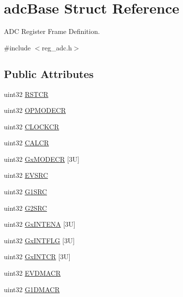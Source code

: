 \hypertarget{structadcBase}{}\section{adc\+Base Struct Reference}
\label{structadcBase}


A\+DC Register Frame Definition.  




{\ttfamily \#include $<$reg\+\_\+adc.\+h$>$}

\subsection*{Public Attributes}
\begin{DoxyCompactItemize}
\item 
uint32 \mbox{\hyperlink{structadcBase_a6662251d3a120476b32339f85c247c52}{R\+S\+T\+CR}}
\item 
uint32 \mbox{\hyperlink{structadcBase_a405e39a2253358f33354e2ce981a6074}{O\+P\+M\+O\+D\+E\+CR}}
\item 
uint32 \mbox{\hyperlink{structadcBase_a2f50ed8a77242fd86b460b2106d4d4f7}{C\+L\+O\+C\+K\+CR}}
\item 
uint32 \mbox{\hyperlink{structadcBase_a5a3b306cbec35ea66b0cfe5310d943a5}{C\+A\+L\+CR}}
\item 
uint32 \mbox{\hyperlink{structadcBase_a2e1b07b4a4782710b38211aa986c8199}{Gx\+M\+O\+D\+E\+CR}} \mbox{[}3\+U\mbox{]}
\item 
uint32 \mbox{\hyperlink{structadcBase_a3887189740f5fcbde31550a5c2097724}{E\+V\+S\+RC}}
\item 
uint32 \mbox{\hyperlink{structadcBase_a3865444918614fe8b7ffee5dd20a92af}{G1\+S\+RC}}
\item 
uint32 \mbox{\hyperlink{structadcBase_a25041ccf95b86b85f19bf4fc1567d3d4}{G2\+S\+RC}}
\item 
uint32 \mbox{\hyperlink{structadcBase_ad829b4c11b40bbc1f677552ee9b4d0a0}{Gx\+I\+N\+T\+E\+NA}} \mbox{[}3\+U\mbox{]}
\item 
uint32 \mbox{\hyperlink{structadcBase_a9e8165173cd3a6b357f03bd82da48c5e}{Gx\+I\+N\+T\+F\+LG}} \mbox{[}3\+U\mbox{]}
\item 
uint32 \mbox{\hyperlink{structadcBase_a2f6867ee8d242ebee0d811555ac8d485}{Gx\+I\+N\+T\+CR}} \mbox{[}3\+U\mbox{]}
\item 
uint32 \mbox{\hyperlink{structadcBase_abfb419ee9dc0e521ba0b632c93221234}{E\+V\+D\+M\+A\+CR}}
\item 
uint32 \mbox{\hyperlink{structadcBase_a16bf2f4da5969a73f355981aacbd061c}{G1\+D\+M\+A\+CR}}

\end{DoxyCompactItemize}
